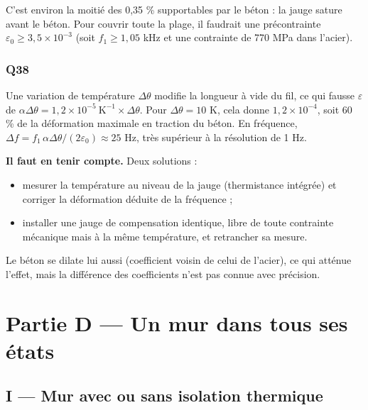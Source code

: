 \documentclass[11pt,a4paper]{article}
\providecommand{\tightlist}{\setlength{\itemsep}{0pt}\setlength{\parskip}{0pt}}
\renewcommand{\geq}{\geqslant}
\newcommand{\equationajustee}[1]{%
  \sbox{\boiteequation}{$\displaystyle #1$}%
  \ifdim\wd\boiteequation>\linewidth
    \[\resizebox{\linewidth}{!}{\usebox{\boiteequation}}\]%
  \else
    \[#1\]%
  \fi}
\begin{document}
\equationajustee{\boxed{|\Delta\varepsilon|_{\max} = \varepsilon_0 \approx 1{,}8\times10^{-3} = 0{,}18\ \%\ \text{en compression}}}

C'est environ la moitié des 0,35 \% supportables par le béton : la jauge sature avant le béton. Pour couvrir toute la plage, il faudrait une précontrainte \(\varepsilon_0 \geq 3{,}5\times10^{-3}\) (soit \(f_1 \geq 1{,}05\) kHz et une contrainte de 770 MPa dans l'acier).

\hypertarget{q38}{%
\subsubsection{Q38}\label{q38}}

Une variation de température \(\Delta\theta\) modifie la longueur à vide du fil, ce qui fausse \(\varepsilon\) de \(\alpha\Delta\theta = 1{,}2\times10^{-5}\ \mathrm{K^{-1}}\times\Delta\theta\). Pour \(\Delta\theta = 10\) K, cela donne \(1{,}2\times10^{-4}\), soit 60 \% de la déformation maximale en traction du béton. En fréquence, \(\Delta f = f_1\,\alpha\Delta\theta/(2\varepsilon_0) \approx 25\) Hz, très supérieur à la résolution de 1 Hz.

\textbf{Il faut en tenir compte.} Deux solutions :

\begin{itemize}
\tightlist
\item
  mesurer la température au niveau de la jauge (thermistance intégrée) et corriger la déformation déduite de la fréquence ;
\item
  installer une jauge de compensation identique, libre de toute contrainte mécanique mais à la même température, et retrancher sa mesure.
\end{itemize}

Le béton se dilate lui aussi (coefficient voisin de celui de l'acier), ce qui atténue l'effet, mais la différence des coefficients n'est pas connue avec précision.

\hypertarget{partie-d-un-mur-dans-tous-ses-uxe9tats}{%
\section{Partie D --- Un mur dans tous ses états}\label{partie-d-un-mur-dans-tous-ses-uxe9tats}}

\hypertarget{i-mur-avec-ou-sans-isolation-thermique}{%
\subsection{I --- Mur avec ou sans isolation thermique}\label{i-mur-avec-ou-sans-isolation-thermique}}
\end{document}
